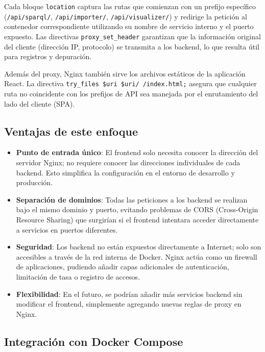 \documentclass{article}
\begin{document}
Cada bloque \texttt{location} captura las rutas que comienzan con un prefijo específico (\texttt{/api/sparql/}, \texttt{/api/importer/}, \texttt{/api/visualizer/}) y redirige la petición al contenedor correspondiente utilizando su nombre de servicio interno y el puerto expuesto. Las directivas \texttt{proxy\_set\_header} garantizan que la información original del cliente (dirección IP, protocolo) se transmita a los backend, lo que resulta útil para registros y depuración.

Además del proxy, Nginx también sirve los archivos estáticos de la aplicación React. La directiva \texttt{try\_files \$uri \$uri/ /index.html;} asegura que cualquier ruta no coincidente con los prefijos de API sea manejada por el enrutamiento del lado del cliente (SPA).

\subsection{Ventajas de este enfoque}

\begin{itemize}
    \item \textbf{Punto de entrada único}: El frontend solo necesita conocer la dirección del servidor Nginx; no requiere conocer las direcciones individuales de cada backend. Esto simplifica la configuración en el entorno de desarrollo y producción.
    \item \textbf{Separación de dominios}: Todas las peticiones a los backend se realizan bajo el mismo dominio y puerto, evitando problemas de CORS (Cross-Origin Resource Sharing) que surgirían si el frontend intentara acceder directamente a servicios en puertos diferentes.
    \item \textbf{Seguridad}: Los backend no están expuestos directamente a Internet; solo son accesibles a través de la red interna de Docker. Nginx actúa como un firewall de aplicaciones, pudiendo añadir capas adicionales de autenticación, limitación de tasa o registro de accesos.
    \item \textbf{Flexibilidad}: En el futuro, se podrían añadir más servicios backend sin modificar el frontend, simplemente agregando nuevas reglas de proxy en Nginx.
\end{itemize}

\subsection{Integración con Docker Compose}
\end{document}
